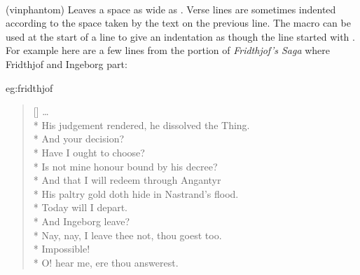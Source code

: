 \begin{syntax}
\cmd{\vinphantom} \\
\end{syntax}
\glossary(vinphantom)%
  {}%
  {Leaves a space as wide as .}
Verse lines are sometimes indented according to the space taken by
the text on the previous line. The macro \cmd{\vinphantom} can be used
at the start of a line to give an indentation 
as though the
line started with . For example here are a few lines from
the portion of \textit{Fridthjof's Saga} where Fridthjof and Ingeborg part:
\begin{egsource}{eg:fridthjof}
\settowidth{\versewidth}{Nay, nay, I leave thee not, 
                         thou goest too}
\begin{verse}[\versewidth]
\ldots \\* 
His judgement rendered, he dissolved the Thing. \\*
 And your decision? \\*
  
                      Have I ought to choose? \\*
Is not mine honour bound by his decree? \\*
And that I will redeem through Angantyr \\*
His paltry gold doth hide in Nastrand's flood. \\*
Today will I depart. \\*
  
                     And Ingeborg leave? \\*
 Nay, nay, I leave thee not, 
                      thou goest too. \\*
 Impossible! \\*
  
                      O! hear me, ere thou answerest.
\end{verse}
\end{egsource}

